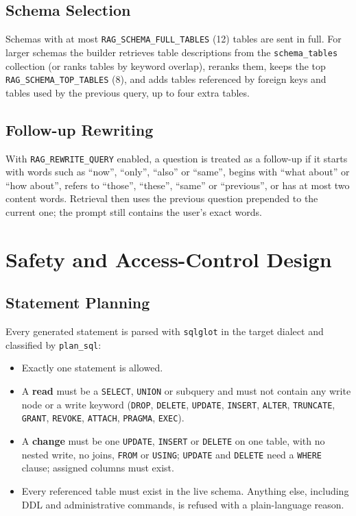 \subsection{Schema Selection}
Schemas with at most \texttt{RAG\_SCHEMA\_FULL\_TABLES} (12) tables are sent in full. For
larger schemas the builder retrieves table descriptions from the \texttt{schema\_tables}
collection (or ranks tables by keyword overlap), reranks them, keeps the top
\texttt{RAG\_SCHEMA\_TOP\_TABLES} (8), and adds tables referenced by foreign keys and tables
used by the previous query, up to four extra tables.

\subsection{Follow-up Rewriting}
With \texttt{RAG\_REWRITE\_QUERY} enabled, a question is treated as a follow-up if it starts
with words such as ``now'', ``only'', ``also'' or ``same'', begins with ``what about'' or
``how about'', refers to ``those'', ``these'', ``same'' or ``previous'', or has at most two
content words. Retrieval then uses the previous question prepended to the current one; the
prompt still contains the user's exact words.

\section{Safety and Access-Control Design}

\subsection{Statement Planning}
Every generated statement is parsed with \texttt{sqlglot} in the target dialect and
classified by \texttt{plan\_sql}:
\begin{itemize}[leftmargin=*, topsep=4pt, itemsep=3pt]
    \item Exactly one statement is allowed.
    \item A \textbf{read} must be a \texttt{SELECT}, \texttt{UNION} or subquery and must not
          contain any write node or a write keyword (\texttt{DROP}, \texttt{DELETE},
          \texttt{UPDATE}, \texttt{INSERT}, \texttt{ALTER}, \texttt{TRUNCATE},
          \texttt{GRANT}, \texttt{REVOKE}, \texttt{ATTACH}, \texttt{PRAGMA}, \texttt{EXEC}).
    \item A \textbf{change} must be one \texttt{UPDATE}, \texttt{INSERT} or \texttt{DELETE}
          on one table, with no nested write, no joins, \texttt{FROM} or \texttt{USING};
          \texttt{UPDATE} and \texttt{DELETE} need a \texttt{WHERE} clause; assigned
          columns must exist.
    \item Every referenced table must exist in the live schema. Anything else, including
          DDL and administrative commands, is refused with a plain-language reason.
\end{itemize}

